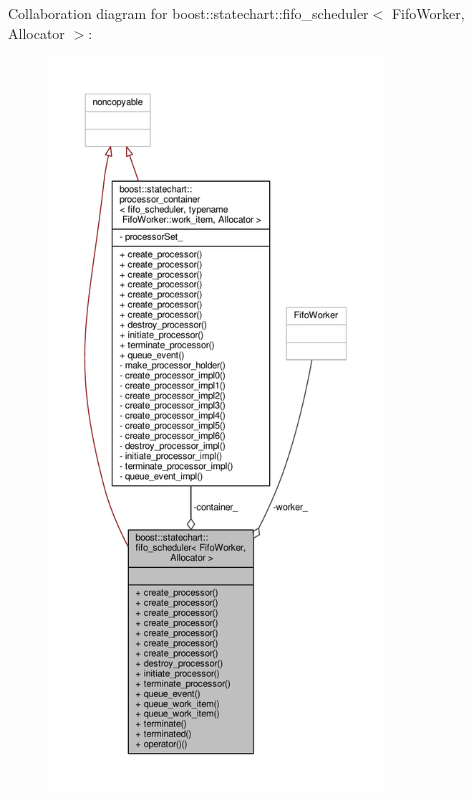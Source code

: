 Collaboration diagram for boost\+:\+:statechart\+:\+:fifo\+\_\+scheduler$<$ Fifo\+Worker, Allocator $>$\+:
\nopagebreak
\begin{figure}[H]
\begin{center}
\leavevmode
\includegraphics[height=550pt]{classboost_1_1statechart_1_1fifo__scheduler__coll__graph}
\end{center}
\end{figure}
